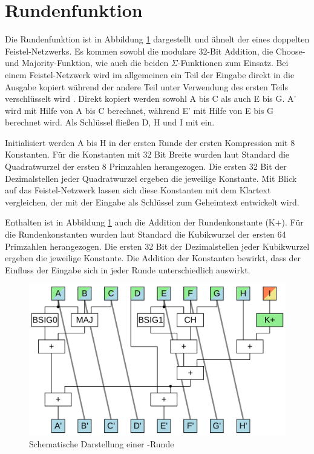 \section{Rundenfunktion}
\label{sec:sha256:runde}

Die Rundenfunktion ist in Abbildung \ref{fig:sha256core} dargestellt und ähnelt der eines doppelten Feistel-Netzwerks.
Es kommen sowohl die modulare 32-Bit Addition, die Choose- und Majority-Funktion, wie auch die beiden $\Sigma$-Funktionen zum Einsatz.
Bei einem Feistel-Netzwerk wird im allgemeinen ein Teil der Eingabe direkt in die Ausgabe kopiert während der andere
Teil unter Verwendung des ersten Teils verschlüsselt wird \cite[311]{crypto1}. Direkt kopiert werden sowohl A bis C
als auch E bis G. A' wird mit Hilfe von A bis C berechnet, während E' mit Hilfe von E bis G berechnet wird.
Als Schlüssel fließen D, H und I mit ein.

Initialisiert werden A bis H in der ersten Runde der ersten Kompression mit 8 Konstanten. Für die Konstanten mit 32 Bit Breite wurden laut
Standard \cite[10]{nist1804} die Quadratwurzel der ersten 8 Primzahlen herangezogen. Die ersten 32 Bit der Dezimalstellen jeder Quadratwurzel
ergeben die jeweilige Konstante. Mit Blick auf das Feistel-Netzwerk lassen sich diese Konstanten mit dem Klartext vergleichen, der mit der
Eingabe als Schlüssel zum Geheimtext entwickelt wird.

Enthalten ist in Abbildung \ref{fig:sha256core} auch die Addition der Rundenkonstante (K+). Für die Rundenkonstanten wurden laut Standard
\cite[10]{nist1804} die Kubikwurzel der ersten 64 Primzahlen herangezogen. Die ersten 32 Bit der Dezimalstellen jeder Kubikwurzel ergeben
die jeweilige Konstante. Die Addition der Konstanten bewirkt, dass der Einfluss der Eingabe sich in jeder Runde unterschiedlich auswirkt.

\begin{figure}[!h]
  \centering
  \includegraphics[scale=0.4]{images/sha256core}
  \caption{Schematische Darstellung einer -Runde}
  \label{fig:sha256core}
\end{figure}